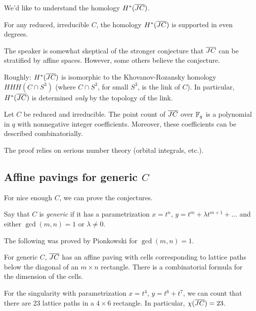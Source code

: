 \documentclass{article}
\begin{document}
We'd like to understand the homology $H^*(\overline{JC})$.

\begin{conj}[Kottwitz]
	For any reduced, irreducible $C$, the homology $H^*(\overline{JC})$ is supported in even degrees.
\end{conj}

The speaker is somewhat skeptical of the stronger conjecture that $\overline{JC}$ can be stratified by affine spaces.
However, some others believe the conjecture.

\begin{conj}
	Roughly: $H^*(\overline{JC})$ is isomorphic to the Khovanov-Rozansky homology $HHH(C \cap S^3)$ (where $C \cap S^3$, for small $S^3$, is the link of $C$).
	In particular, $H^*(\overline{JC})$ is determined \emph{only} by the topology of the link.
\end{conj}

\begin{thm}
	Let $C$ be reduced and irreducible.
	The point count of $\overline{JC}$ over $\mathbb{F}_q$ is a polynomial in $q$ with nonnegative integer coefficients.
	Moreover, these coefficients can be described combinatorially.
\end{thm}

The proof relies on serious number theory (orbital integrals, etc.).

\subsection{Affine pavings for generic $C$}

For nice enough $C$, we can prove the conjectures.

\begin{dfn}
	Say that $C$ is \emph{generic} if it has a parametrization $x = t^n$, $y = t^m + \lambda t^{m+1} + \dots$ and either $\gcd(m, n) = 1$ or $\lambda \neq 0$.
\end{dfn}

The following was proved by Pionkowski for $\gcd(m, n) = 1$.

\begin{thm}
	For generic $C$, $\overline{JC}$ has an affine paving with cells corresponding to lattice paths below the diagonal of an $m \times n$ rectangle.
	There is a combinatorial formula for the dimension of the cells.
\end{thm}

\begin{ex}
	For the singularity with parametrization $x = t^4$, $y = t^6 + t^7$, we can count that there are 23 lattice paths in a $4 \times 6$ rectangle.
	In particular, $\chi(\overline{JC}) = 23$.
\end{ex}
\end{document}
